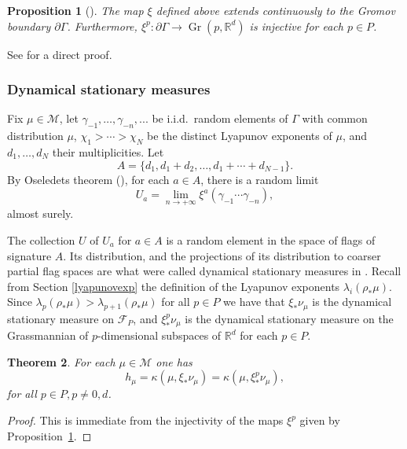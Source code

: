 \documentclass[10pt,a4paper]{amsart}
\newtheorem{theorem}{Theorem}[section]
\newtheorem{proposition}[theorem]{Proposition}
\newcommand{\R}{\mathbb{R}}
\newcommand{\F}{\mathcal{F}}
\newcommand{\M}{\mathcal M}
\let\g\gamma
\DeclareMathOperator{\Gr}{Gr}
\begin{document}
\begin{proposition}[\cite{GGKW17}]\label{boundarymapstheorem}
The map \(\xi\) defined above extends continuously to the Gromov boundary \(\partial \Gamma\). Furthermore, \(\xi^p:\partial\Gamma \to \Gr(p,\R^d)\) is injective for each \(p \in P\).
\end{proposition}

See \cite[Prop.\,30.3]{canary} for a direct proof.

\subsubsection{Dynamical stationary measures}

Fix \(\mu \in \M\), let \(\g_{-1},\ldots, \g_{-n},..\). be i.i.d.\ random elements of \(\Gamma\) with common distribution \(\mu\), \(\chi_1 > \cdots > \chi_N\) be the distinct Lyapunov exponents of \(\mu\), and \(d_1,\ldots, d_N\) their multiplicities.
Let
\[
A = \lbrace d_1, d_1+d_2,\ldots, d_1+\cdots + d_{N-1} \rbrace.
\]
By Oseledets theorem (\cite{Ose68}), for each \(a \in A\), there is a random limit
\[
U_a = \lim_{n \to +\infty} \xi^a(\g_{-1}\cdots \g_{-n}),
\]
almost surely.

The collection \(U\) of \(U_a\) for \(a \in A\) is a random element in the space of flags of signature \(A\). Its distribution, and the projections of its distribution to coarser partial flag spaces are what were called dynamical stationary measures in \cite{LL23}. Recall from Section \ref{lyapunovexp} the definition of the Lyapunov exponents \(\lambda_i(\rho_*\mu)\). Since \(\lambda_p(\rho_*\mu) > \lambda_{p+1}(\rho_*\mu)\) for all \(p \in P\) we have that \(\xi_*\nu_\mu\) is the dynamical stationary measure on \(\F_P\), and \(\xi^p_*\nu_\mu\) is the dynamical stationary measure on the Grassmannian of \(p\)-dimensional subspaces of \(\R^d\) for each \(p \in P\).


\begin{theorem}\label{entropytheorem}
For each \(\mu \in \M\) one has
\[
h_\mu = \kappa(\mu,\xi_*\nu_\mu) = \kappa(\mu,\xi^p_*\nu_\mu),
\]
for all \(p \in P, p\not = 0,d\).
\end{theorem}
\begin{proof}
This is immediate from the injectivity of the maps \(\xi^p\) given by Proposition~\ref{boundarymapstheorem}.
\end{proof}

\end{document}
